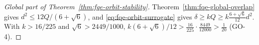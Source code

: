 \begin{proof}[Global part of Theorem~\ref{thm:fqe-orbit-stability}]
Theorem~\ref{thm:fqe-global-overlap} gives $d^2\le12Q/(6+\sqrt6)$, and \eqref{eq:fqe-orbit-surrogate} gives
$\delta\ge kQ\ge k\frac{6+\sqrt6}{12}d^2$. With $k>16/225$ and $\sqrt6>2449/1000$,
$k(6+\sqrt6)/12>\frac{16}{225}\cdot\frac{8449}{12000}>\frac1{20}$ (GO-4).
\end{proof}
